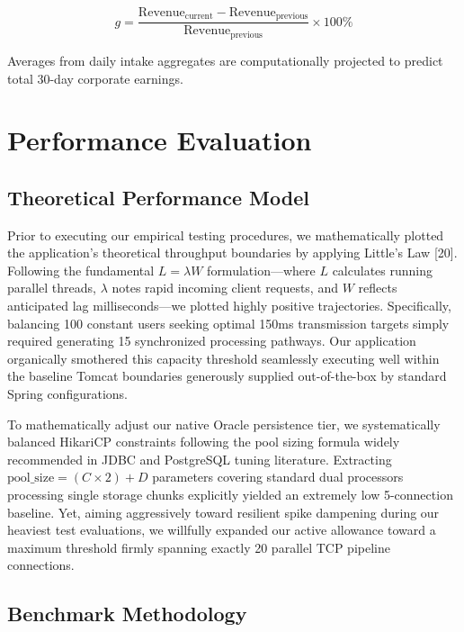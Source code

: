 \begin{equation}
g = \frac{\text{Revenue}_{\text{current}} - \text{Revenue}_{\text{previous}}}{\text{Revenue}_{\text{previous}}} \times 100\%
\end{equation}

Averages from daily intake aggregates are computationally projected to
predict total 30-day corporate earnings.

\section{Performance Evaluation}\label{performance-evaluation}

\subsection{Theoretical Performance
Model}\label{theoretical-performance-model}

Prior to executing our empirical testing procedures, we mathematically
plotted the application's theoretical throughput boundaries by applying
Little's Law {[}20{]}. Following the fundamental \(L = \lambda W\)
formulation---where \(L\) calculates running parallel threads,
\(\lambda\) notes rapid incoming client requests, and \(W\) reflects
anticipated lag milliseconds---we plotted highly positive trajectories.
Specifically, balancing 100 constant users seeking optimal 150ms
transmission targets simply required generating 15 synchronized
processing pathways. Our application organically smothered this capacity
threshold seamlessly executing well within the baseline Tomcat
boundaries generously supplied out-of-the-box by standard Spring
configurations.

To mathematically adjust our native Oracle persistence tier, we
systematically balanced HikariCP constraints following the pool sizing
formula widely recommended in JDBC and PostgreSQL tuning literature.
Extracting \(\text{pool\_size} = (C \times 2) + D\) parameters covering
standard dual processors processing single storage chunks explicitly
yielded an extremely low 5-connection baseline. Yet, aiming aggressively
toward resilient spike dampening during our heaviest test evaluations,
we willfully expanded our active allowance toward a maximum threshold
firmly spanning exactly 20 parallel TCP pipeline connections.

\subsection{Benchmark Methodology}\label{benchmark-methodology}

